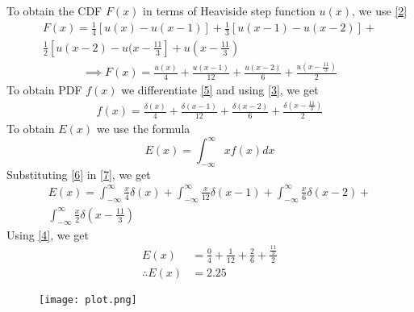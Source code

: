 \documentclass[journal,12pt,twocolumn]{IEEEtran}
\begin{document}
\textrightarrow To obtain the CDF $F(x)$ in terms of Heaviside step function $u(x)$, we use \eqref{2}
\begin{multline*}
F(x)=\frac{1}{4}[u(x)-u(x-1)]+\frac{1}{3}[u(x-1)-u(x-2)]+\\
\frac{1}{2}[u(x-2)-u(x-\frac{11}{3}]+u(x-\frac{11}{3})
\end{multline*}
\begin{align*}
\implies F(x)=\frac{u(x)}{4}+\frac{u(x-1)}{12}+\frac{u(x-2)}{6}+\frac{u(x-\frac{11}{3})}{2} \tag{5} \label{5}
\end{align*}
\textrightarrow To obtain PDF $f(x)$ we differentiate \eqref{5} and using \eqref{3}, we get
\begin{align*}
f(x)=\frac{\delta(x)}{4}+\frac{\delta(x-1)}{12}+\frac{\delta(x-2)}{6}+\frac{\delta(x-\frac{11}{3})}{2} \tag{6} \label{6}
\end{align*}
\textrightarrow To obtain $E(x)$ we use the formula
\begin{equation*}
E(x)=\int_{-\infty}^{\infty} xf(x)dx \tag{7} \label{7}
\end{equation*}
\textrightarrow Substituting \eqref{6} in \eqref{7}, we get
\begin{multline*}
E(x)=\int_{-\infty}^{\infty} \frac{x}{4}\delta(x)+\int_{-\infty}^{\infty} \frac{x}{12}\delta(x-1)+\int_{-\infty}^{\infty} \frac{x}{6}\delta(x-2)+\\ 
\int_{-\infty}^{\infty} \frac{x}{2}\delta(x-\frac{11}{3}) 
\end{multline*}
\textrightarrow Using \eqref{4}, we get
\begin{align*}
E(x)&=\frac{0}{4}+\frac{1}{12}+\frac{2}{6}+\frac{\frac{11}{3}}{2} \\
\therefore E(x)&=2.25 
\end{align*}
\newpage
\begin{figure}[h!]
    \centering
    \texttt{[image: plot.png]}
    \label{fig:1}
\end{figure}
\end{document}
